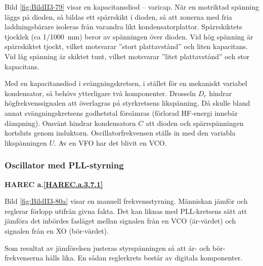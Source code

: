 Bild \ref{fig:BildII3-79} visar en kapacitansdiod -- varicap.
När en motriktad spänning läggs på dioden, så bildas ett spärrskikt i dioden,
så att zonerna med fria laddningsbärare isoleras från varandra likt
kondensatorplattor.
Spärrskiktets tjocklek (ca 1/1000~mm) beror av spänningen över dioden.
Vid hög spänning är spärrskiktet tjockt, vilket motsvarar
''stort plattavstånd'' och liten kapacitans.
Vid låg spänning är skiktet tunt, vilket motsvarar ''litet plattavstånd'' och
stor kapacitans.

Med en kapacitansdiod i svängningskretsen, i stället för en mekaniskt
variabel kondensator, så behövs ytterligare två komponenter.
Drosseln \(D_r\) hindrar högfrekvenssignalen att överlagras på styrkretsens
likspänning.
Då skulle bland annat svängningskretsens godhetstal försämras (förlorad HF-energi
innebär dämpning).
Omvänt hindrar kondensatorn \(C\) att dioden och spärrspänningen kortsluts genom
induktorn.
Oscillatorfrekvensen ställs in med den variabla likspänningen \(U\).
Av en VFO har det blivit en VCO.

\subsubsection{Oscillator med PLL-styrning}
\textbf{HAREC a.\ref{HAREC.a.3.7.1}\label{myHAREC.a.3.7.1}}

Bild \ref{fig:BildII3-80a} visar en manuell frekvensstyrning.
Människan jämför och reglerar förlopp utifrån givna fakta.
Det kan liknas med PLL-kretsens sätt att jämföra det inbördes fasläget mellan
signalen från en VCO (är-värdet) och signalen från en XO (bör-värdet).

Som resultat av jämförelsen justeras styrspänningen så att är- och
bör-frekvenserna hålls lika.
En sådan reglerkrets består av digitala komponenter.

